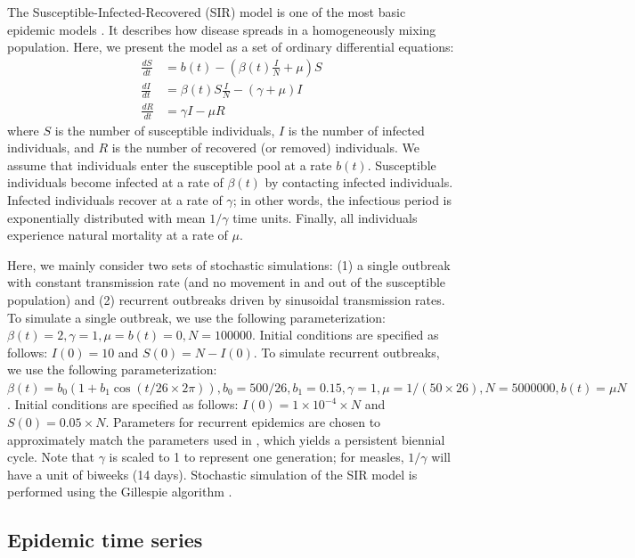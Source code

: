 \documentclass{article}
\begin{document}
The Susceptible-Infected-Recovered (SIR) model is one of the most basic epidemic models \citep{kermack1927contribution}.
It describes how disease spreads in a homogeneously mixing population.
Here, we present the model as a set of ordinary differential equations:
\begin{equation}\label{eq:sir}
\begin{aligned}
\frac{dS}{dt} &= b(t) - \left(\beta(t) \frac{I}{N} + \mu \right) S\\
\frac{dI}{dt} &= \beta(t) S \frac{I}{N} - (\gamma + \mu) I\\
\frac{dR}{dt} &= \gamma I - \mu R
\end{aligned}
\end{equation}
where $S$ is the number of susceptible individuals, $I$ is the number of infected individuals, and $R$ is the number of recovered (or removed) individuals.
We assume that individuals enter the susceptible pool at a rate $b(t)$.
Susceptible individuals become infected at a rate of $\beta(t)$ by contacting infected individuals.
Infected individuals recover at a rate of $\gamma$;
in other words, the infectious period is exponentially distributed with mean $1/\gamma$ time units.
Finally, all individuals experience natural mortality at a rate of $\mu$.

Here, we mainly consider two sets of stochastic simulations: (1) a single outbreak with constant transmission rate (and no movement in and out of the susceptible population) and (2) recurrent outbreaks driven by sinusoidal transmission rates.
To simulate a single outbreak, we use the following parameterization: $\beta(t) = 2, \gamma=1, \mu=b(t) = 0, N=100000$.
Initial conditions are specified as follows: $I(0) = 10$ and $S(0) = N - I(0)$.
To simulate recurrent outbreaks, we use the following parameterization: $\beta(t) = b_0 (1 + b_1 \cos (t/26 \times 2\pi)), b_0 = 500/26, b_1 = 0.15, \gamma = 1, \mu=1/(50 \times 26), N=5000000, b(t) = \mu N$. 
Initial conditions are specified as follows: $I(0) = 1 \times 10^{-4} \times N$ and $S(0) = 0.05 \times N$.
Parameters for recurrent epidemics are chosen to approximately match the parameters used in \cite{earn1998persistence}, which yields a persistent biennial cycle.
Note that $\gamma$ is scaled to 1 to represent one generation; for measles, $1/\gamma$ will have a unit of biweeks (14 days).
Stochastic simulation of the SIR model is performed using the Gillespie algorithm \citep{gillespie1976general}.

\subsection{Epidemic time series}
\end{document}
